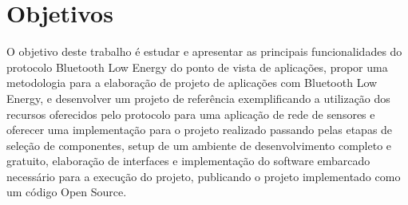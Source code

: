 \section{Objetivos}

O objetivo deste trabalho é estudar e apresentar as principais funcionalidades
do protocolo Bluetooth Low Energy do ponto de vista de aplicações,
propor uma metodologia para a elaboração de projeto de aplicações com
Bluetooth Low Energy, e desenvolver um projeto de referência exemplificando a
utilização dos recursos oferecidos pelo protocolo para uma aplicação de rede de
sensores e oferecer uma implementação para o projeto realizado passando pelas
etapas de seleção de componentes, setup de um ambiente de desenvolvimento
completo e gratuito, elaboração de interfaces e implementação do software
embarcado necessário para a execução do projeto, publicando o projeto
implementado como um código Open Source.
